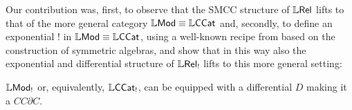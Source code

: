 \documentclass[submission,%
]{eptcs}
\begin{document}




Our contribution was, first, to observe that the SMCC structure of $\mathbb{L} \mathsf{Rel}$ lifts to that of the more general category $\mathbb{L}\mathsf{Mod}\equiv\mathbb{L}\mathsf{CCat}$ and, secondly, to define an exponential $!$ in $\mathbb{L}\mathsf{Mod}\equiv\mathbb{L}\mathsf{CCat}$, using a well-known recipe from \cite{Mellies2018, Manzo2013} based on the construction of symmetric algebras, and show that in this way also the exponential and differential structure of $\mathbb{L} \mathsf{Rel}_{!}$ lifts to this more general setting:
%
\begin{theorem}
$\mathbb{L}\mathsf{Mod}_{!}$ or, equivalently, $\mathbb{L}\mathsf{CCat}_{!}$, can be equipped with a differential $D$ making it a $CC\partial C$.
\end{theorem}
\end{document}
